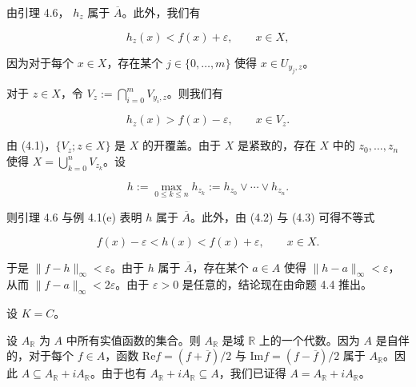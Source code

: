 \begin{theorem}
\begin{items}
\begin{subitems}
由引理 4.6， $ h_{z} $ 属于  $ \overline{A} $。此外，我们有

\begin{equation}
h_{z}(x)<f(x)+\varepsilon,\qquad x\in X,
\end{equation}

因为对于每个  $ x \in X $，存在某个  $ j \in \{0, \ldots, m\} $ 使得  $ x \in U_{y_j,z} $。

\item

对于  $ z \in X $，令  $ V_z := \bigcap_{i=0}^{m} V_{y_i,z} $。则我们有

\begin{equation}
h_{z}(x)>f(x)-\varepsilon,\qquad x\in V_{z}.
\end{equation}

由 (4.1)，$\{V_z; z \in X\}$ 是 $X$ 的开覆盖。由于 $X$ 是紧致的，存在 $X$ 中的 $z_0, \ldots, z_n$ 使得 $X = \bigcup_{k=0}^n V_{z_k}$。设

\[
h:=\max_{0\leq k\leq n}h_{z_{k}}:=h_{z_{0}}\lor\cdots\lor h_{z_{n}}.
\]

则引理 4.6 与例 4.1(e) 表明 $h$ 属于 $\overline{A}$。此外，由 (4.2) 与 (4.3) 可得不等式

\[
f(x)-\varepsilon<h(x)<f(x)+\varepsilon,\qquad x\in X.
\]

于是  $ \|f - h\|_\infty < \varepsilon $。由于  $ h $ 属于  $ \overline{A} $，存在某个  $ a \in A $ 使得  $ \|h - a\|_\infty < \varepsilon $，从而  $ \|f - a\|_\infty < 2\varepsilon $。由于  $ \varepsilon > 0 $ 是任意的，结论现在由命题 4.4 推出。

\end{subitems}

\item

设  $ K = C $。

\end{items}

\begin{subitems}
\item

设 $A_{\mathbb{R}}$ 为 $A$ 中所有实值函数的集合。则 $A_{\mathbb{R}}$ 是域 $\mathbb{R}$ 上的一个代数。因为 $A$ 是自伴的，对于每个 $f \in A$，函数 $\mathrm{Re}f = (f + \overline{f})/2$ 与 $\mathrm{Im}f = (f - \overline{f})/2$ 属于 $A_{\mathbb{R}}$。因此 $A \subseteq A_{\mathbb{R}} + iA_{\mathbb{R}}$。由于也有 $A_{\mathbb{R}} + iA_{\mathbb{R}} \subseteq A$，我们已证得 $A = A_{\mathbb{R}} + iA_{\mathbb{R}}$。

\item


\end{subitems}
\end{theorem}
